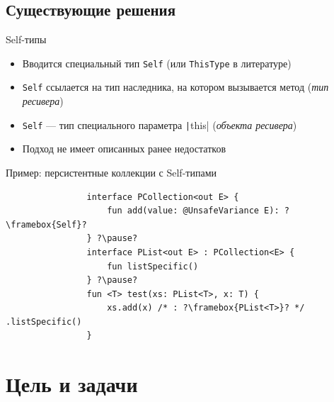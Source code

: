 \documentclass[aspectratio=169,usenames,dvipsnames]{beamer}
\begin{document}
    \subsection{Существующие решения}

    \begin{frame}[fragile]{Self-типы}


        \begin{itemize}
            \item Вводится специальный тип \texttt{Self} (или \texttt{ThisType} в литературе)
            \item \texttt{Self} ссылается на тип наследника, на котором вызывается метод (\emph{тип ресивера})
            \item \texttt{Self} --- тип специального параметра \texttt|this| (\emph{объекта ресивера})
            \item Подход не имеет описанных ранее недостатков
        \end{itemize}

        \pause

        \begin{block}{Пример: персистентные коллекции с Self-типами}
            \begin{verbatim}
                interface PCollection<out E> {
                    fun add(value: @UnsafeVariance E): ?\framebox{Self}?
                } ?\pause?
                interface PList<out E> : PCollection<E> {
                    fun listSpecific()
                } ?\pause?
                fun <T> test(xs: PList<T>, x: T) {
                    xs.add(x) /* : ?\framebox{PList<T>}? */ .listSpecific()
                }
            \end{verbatim}
        \end{block}
    \end{frame}


    \section{Цель и задачи}
\end{document}
